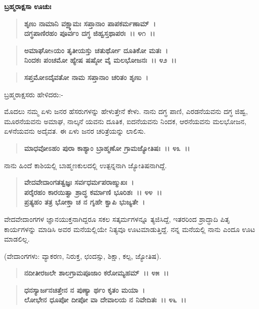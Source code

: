 \begin{flushleft}
\textbf{ಬ್ರಹ್ಮರಾಕ್ಷಸಾ ಊಚುಃ\enginline{-}}
\end{flushleft}

\begin{verse}
\textbf{ಶೃಣು ನಾಮಾನಿ ವಕ್ಷ್ಯಾಮಃ ಸಪ್ತಾನಾಂ ಪಾಪಕರ್ಮಣಾಮ್~।}\\\textbf{ದಗ್ಧಪಾಣಿರಹಂ ಪೂರ್ವಂ ದಗ್ಧ ಜಿಹ್ವಸ್ತಥಾಪರಃ~।। ೪೧~।। }
\end{verse}

\begin{verse}
\textbf{ಅಮಾಘೋsಯಂ ತೃತೀಯಸ್ತು ಚತುರ್ಥೋ ದೂತಿಕೋ ಮತಃ~।}\\\textbf{ನಿಂದಕಃ ಪಂಚಮೋ ಹ್ಯೇಷ ಷಷ್ಠೋ ವೈ ಮಲಭೋಜನಃ~।। ೪೨~।।}
\end{verse}

\begin{verse}
\textbf{ಸಪ್ತಮೋಽದೈವತೋ ನಾಮ ಸಪ್ತಾನಾಂ ಚರಿತಂ ಶೃಣು~।}
\end{verse}

\noindent
 ಬ್ರಹ್ಮರಾಕ್ಷಸರು ಹೇಳಿದರು:-

ಮೊದಲು ನಮ್ಮ ಏಳು ಜನರ ಹೆಸರುಗಳನ್ನು ಹೇಳುತ್ತೇನೆ ಕೇಳು. ನಾನು ದಗ್ಧ ಪಾಣಿ, ಎರಡನೆಯವನು ದಗ್ಧ ಜಿಹ್ವ, ಮೂರನೆಯವನು ಅಮಾಘ, ನಾಲ್ಕನೆ ಯವನು ದೂತಿಕ, ಐದನೆಯವನು ನಿಂದಕ, ಆರನೆಯವನು ಮಲಭೋಜನ, ಏಳನೆಯವನು ಅದೈವತ. ಈ ಏಳು ಜನರ ಚರಿತ್ರೆಯನ್ನು ಲಾಲಿಸು.

\begin{verse}
\textbf{ಮಾಧವೋಽಹಂ ಪುರಾ ಕಾಶ್ಯಾಂ ಬ್ರಾಹ್ಮಣೋ ಗ್ರಾಮಜ್ಯೋತಿಷಃ~।। ೪೩~।।}
\end{verse}

ನಾನು ಹಿಂದೆ ಕಾಶಿಯಲ್ಲಿ ಬಾಹ್ಮಣಕುಲದಲ್ಲಿ ಉತ್ಪನ್ನನಾಗಿ ಜ್ಯೋತಿಷನಾಗಿದ್ದೆ.

\begin{verse}
\textbf{ವೇದವೇದಾಂಗತತ್ವಜ್ಞಃ ಸರ್ವಧರ್ಮಪರಾಙ್ಮುಖಃ~।}\\\textbf{ಪರೈರಹಂ ಕಾರಯಿತ್ವಾ ಶ್ರಾದ್ಧ ಕರ್ಮಾಣಿ ಭೂರಿಶಃ~।। ೪೪~।। }\\\textbf{ಪ್ರತ್ಯಹಂ ತತ್ರ ಭೋಕ್ತಾ ಚ ನ ಗೃಹೇ ಕ್ವಾಪಿ ಭುಜ್ಯತೇ~।}
\end{verse}

ವೇದವೇದಾಂಗಗಳ ಜ್ಞಾನಯುಕ್ತನಾಗಿದ್ದರೂ ಸಕಲ ಸತ್ಕರ್ಮಗಳನ್ನೂ ತ್ಯಜಿಸಿದ್ದೆ, ಇತರರಿಂದ ಶ್ರಾದ್ಧಾದಿ ಪಿತೃ ಕಾರ್ಯಗಳನ್ನು ಮಾಡಿಸಿ ಅವರ ಮನೆಯಲ್ಲಿಯೇ ನಿತ್ಯವೂ ಊಟಮಾಡುತ್ತಿದ್ದೆ. ನನ್ನ ಮನೆಯಲ್ಲಿ ನಾನು ಎಂದೂ ಊಟ ಮಾಡಲಿಲ್ಲ.

(ವೇದಾಂಗಗಳು: ವ್ಯಾಕರಣ, ನಿರುಕ್ತ, ಛಂದಸ್ಸು, ಶಿಕ್ಷಾ, ಕಲ್ಪ, ಜ್ಯೋತಿಷ).

\begin{verse}
\textbf{ನದೀತೀರಜಲೇ ಶಾಲಗ್ರಾಮಪೂಜಾಂ ಕರೋಮ್ಯಹಮ್~।। ೪೫~।।} 
\end{verse}

\begin{verse}
\textbf{ಧನಸ್ಯಾರ್ಜನಚಿತ್ತೇನ ನ ಪುಣ್ಯಾ ರ್ಥಂ ಕೃತಂ ಮಯಾ~।}\\\textbf{ಲೋಭೇನ ಧೂಪೋ ದೀಪೋ ವಾ ದೇವಾಲಯ ನ ನಿವೇದಿತಃ~।। ೪೬~।।}
\end{verse}

